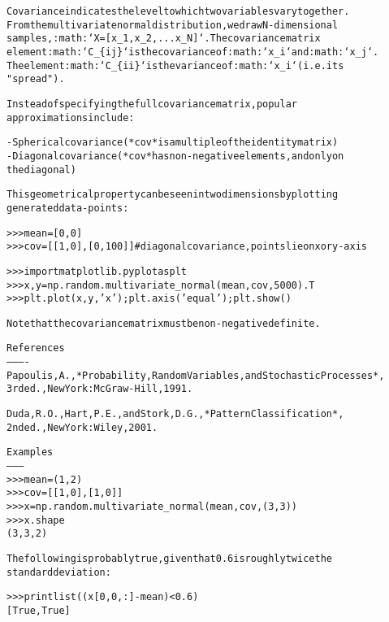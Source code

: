 \begin{boxedminipage}{\funcwidth}
\begin{alltt}
Covariance indicates the level to which two variables vary together.
From the multivariate normal distribution, we draw N-dimensional
samples, :math:`X = [x\_1, x\_2, ... x\_N]`.  The covariance matrix
element :math:`C\_\{ij\}` is the covariance of :math:`x\_i` and :math:`x\_j`.
The element :math:`C\_\{ii\}` is the variance of :math:`x\_i` (i.e. its
"spread").

Instead of specifying the full covariance matrix, popular
approximations include:

  - Spherical covariance (*cov* is a multiple of the identity matrix)
  - Diagonal covariance (*cov* has non-negative elements, and only on
    the diagonal)

This geometrical property can be seen in two dimensions by plotting
generated data-points:

{\textgreater}{\textgreater}{\textgreater} mean = [0,0]
{\textgreater}{\textgreater}{\textgreater} cov = [[1,0],[0,100]] \# diagonal covariance, points lie on x or y-axis

{\textgreater}{\textgreater}{\textgreater} import matplotlib.pyplot as plt
{\textgreater}{\textgreater}{\textgreater} x,y = np.random.multivariate\_normal(mean,cov,5000).T
{\textgreater}{\textgreater}{\textgreater} plt.plot(x,y,'x'); plt.axis('equal'); plt.show()

Note that the covariance matrix must be non-negative definite.

References
----------
Papoulis, A., *Probability, Random Variables, and Stochastic Processes*,
3rd ed., New York: McGraw-Hill, 1991.

Duda, R. O., Hart, P. E., and Stork, D. G., *Pattern Classification*,
2nd ed., New York: Wiley, 2001.

Examples
--------
{\textgreater}{\textgreater}{\textgreater} mean = (1,2)
{\textgreater}{\textgreater}{\textgreater} cov = [[1,0],[1,0]]
{\textgreater}{\textgreater}{\textgreater} x = np.random.multivariate\_normal(mean,cov,(3,3))
{\textgreater}{\textgreater}{\textgreater} x.shape
(3, 3, 2)

The following is probably true, given that 0.6 is roughly twice the
standard deviation:

{\textgreater}{\textgreater}{\textgreater} print list( (x[0,0,:] - mean) {\textless} 0.6 )
[True, True]
\end{alltt}

\setlength{\parskip}{1ex}
    \end{boxedminipage}

    \label{QSTK:qstklearn:mldiagnostics:negative_binomial}

